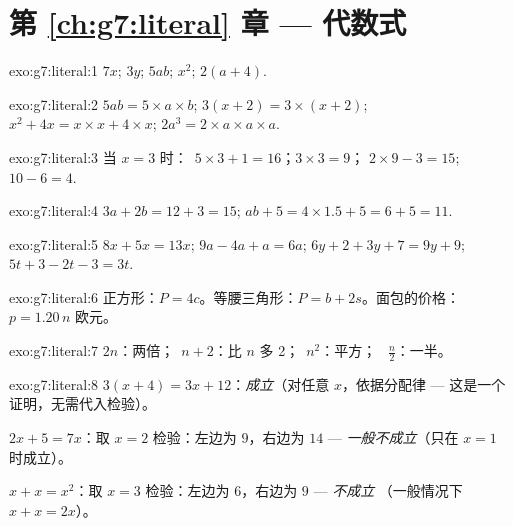 \section*{第 \ref{ch:g7:literal} 章 --- 代数式}

\begin{solution}{exo:g7:literal:1}
$7x$; \quad $3y$; \quad $5ab$; \quad $x^2$; \quad $2(a + 4)$.
\end{solution}

\begin{solution}{exo:g7:literal:2}
$5ab = 5 \times a \times b$; \quad
$3(x+2) = 3 \times (x + 2)$; \quad
$x^2 + 4x = x \times x + 4 \times x$; \quad
$2a^3 = 2 \times a \times a \times a$.
\end{solution}

\begin{solution}{exo:g7:literal:3}
当 $x = 3$ 时：\ $5 \times 3 + 1 = 16$；\quad $3 \times 3 = 9$；\quad
$2 \times 9 - 3 = 15$; \quad $10 - 6 = 4$.
\end{solution}

\begin{solution}{exo:g7:literal:4}
$3a + 2b = 12 + 3 = 15$; \qquad
$ab + 5 = 4 \times 1.5 + 5 = 6 + 5 = 11$.
\end{solution}

\begin{solution}{exo:g7:literal:5}
$8x + 5x = 13x$; \quad
$9a - 4a + a = 6a$; \quad
$6y + 2 + 3y + 7 = 9y + 9$; \quad
$5t + 3 - 2t - 3 = 3t$.
\end{solution}

\begin{solution}{exo:g7:literal:6}
正方形：$P = 4c$。等腰三角形：$P = b + 2s$。面包的价格：
$p = 1.20\,n$ 欧元。
\end{solution}

\begin{solution}{exo:g7:literal:7}
$2n$：两倍；\ $n + 2$：比 $n$ 多 2；\ $n^2$：平方；
\ $\frac n2$：一半。
\end{solution}

\begin{solution}{exo:g7:literal:8}
$3(x+4) = 3x + 12$：\emph{成立}（对任意 $x$，依据分配律 ---
这是一个证明，无需代入检验）。

$2x + 5 = 7x$：取 $x = 2$ 检验：左边为 $9$，右边为 $14$ ---
\emph{一般不成立}（只在 $x = 1$ 时成立）。

$x + x = x^2$：取 $x = 3$ 检验：左边为 $6$，右边为 $9$ --- \emph{不成立}
（一般情况下 $x + x = 2x$）。
\end{solution}

